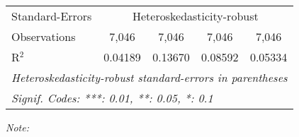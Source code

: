 \begin{table}[htbp!]
\begin{adjustbox}{width = 1\textwidth, max height = 0.95\textheight, center}
\begin{threeparttable}[b]
\begin{tabular}{lcccc}
            \midrule 
            Standard-Errors & \multicolumn{4}{c}{Heteroskedasticity-robust} \\ 
            Observations         & 7,046                          & 7,046                          & 7,046                          & 7,046\\  
            R$^2$                & 0.04189                        & 0.13670                        & 0.08592                        & 0.05334\\  
            \midrule \midrule
            \multicolumn{5}{l}{\emph{Heteroskedasticity-robust standard-errors in parentheses}}\\
            \multicolumn{5}{l}{\emph{Signif. Codes: ***: 0.01, **: 0.05, *: 0.1}}\\
         \end{tabular}
         
         \begin{tablenotes}\item \medskip \textit{Note:}
         \end{tablenotes}
      \end{threeparttable}
   \end{adjustbox}
\end{table}



